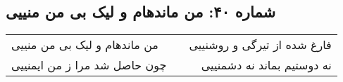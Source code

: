 \begin{center}
\section*{شماره ۴۰: من ماندهام و لیک بی من منییی}
\label{sec:040}
\begin{longtable}{l p{0.5cm} r}
من ماندهام و لیک بی من منییی
&&
فارغ شده از تیرگی و روشنییی
\\
چون حاصل شد مرا ز من ایمنییی
&&
نه دوستیم بماند نه دشمنییی
\\
\end{longtable}
\end{center}
